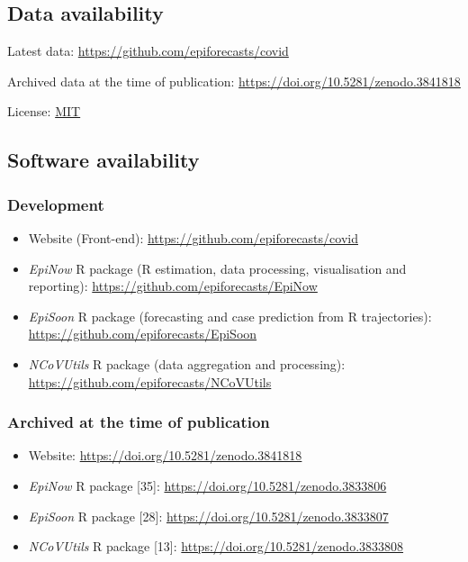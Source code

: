 \documentclass[
]{article}
\providecommand{\tightlist}{%
  \setlength{\itemsep}{0pt}\setlength{\parskip}{0pt}}
\begin{document}
\hypertarget{data-availability}{%
\subsection{Data availability}\label{data-availability}}

Latest data: \url{https://github.com/epiforecasts/covid}

Archived data at the time of publication:
\url{https://doi.org/10.5281/zenodo.3841818}

License: \href{https://opensource.org/licenses/MIT}{MIT}

\hypertarget{software-availability}{%
\subsection{Software availability}\label{software-availability}}

\hypertarget{development}{%
\subsubsection{Development}\label{development}}

\begin{itemize}
\tightlist
\item
  Website (Front-end): \url{https://github.com/epiforecasts/covid}
\item
  \emph{EpiNow} R package (R estimation, data processing, visualisation
  and reporting): \url{https://github.com/epiforecasts/EpiNow}
\item
  \emph{EpiSoon} R package (forecasting and case prediction from R
  trajectories): \url{https://github.com/epiforecasts/EpiSoon}
\item
  \emph{NCoVUtils} R package (data aggregation and processing):
  \url{https://github.com/epiforecasts/NCoVUtils}
\end{itemize}

\hypertarget{archived-at-the-time-of-publication}{%
\subsubsection{Archived at the time of
publication}\label{archived-at-the-time-of-publication}}

\begin{itemize}
\tightlist
\item
  Website: \url{https://doi.org/10.5281/zenodo.3841818}
\item
  \emph{EpiNow} R package {[}35{]}:
  \url{https://doi.org/10.5281/zenodo.3833806}
\item
  \emph{EpiSoon} R package {[}28{]}:
  \url{https://doi.org/10.5281/zenodo.3833807}
\item
  \emph{NCoVUtils} R package {[}13{]}:
  \url{https://doi.org/10.5281/zenodo.3833808}
\end{itemize}
\end{document}
